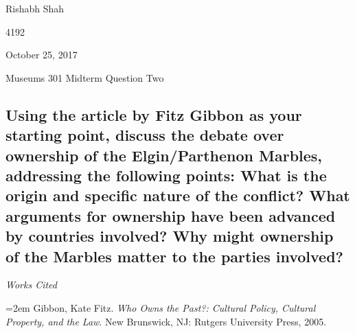 \documentclass[11pt]{article}
\begin{document}
\singlespacing
{\Large\noindent Rishabh Shah

 4192

\noindent October 25, 2017

\noindent Museums 301 Midterm Question Two}

\subsection*{Using the article by Fitz Gibbon as your starting point, discuss the debate over ownership of the Elgin/Parthenon Marbles, addressing the following points: What is the origin and specific nature of the conflict? What arguments for ownership have been advanced by countries involved? Why might ownership of the Marbles matter to the parties involved?}

\doublespacing


\newpage
\singlespacing
\begin{center}
\textit{Works Cited}
\end{center}

\hangindent=2em
\noindent Gibbon, Kate Fitz. \textit{Who Owns the Past?: Cultural Policy, Cultural Property, and the Law}. New Brunswick, NJ: Rutgers University Press, 2005.
\end{document}
